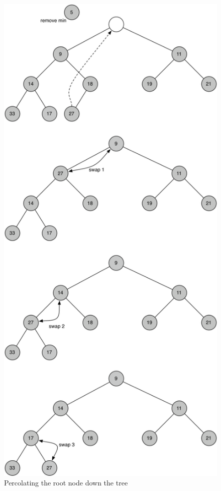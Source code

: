 \documentclass[11pt]{article}
\begin{document}
\begin{figure}
\centering
\includegraphics{figures/percolate-down.png}
\caption{Percolating the root node down the tree}
\end{figure}
\end{document}
